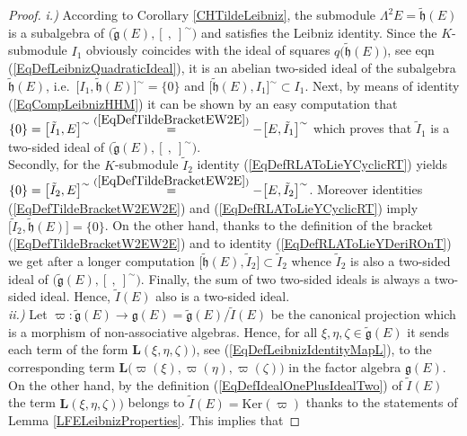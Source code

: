 \documentclass [11pt] {article}
\theoremstyle{definition}
\begin{document}
\begin{proof} \textit{i.)} According to  Corollary
	\ref{CHTildeLeibniz}, the submodule $\Lambda^2E=\tilde{\mathfrak{h}}(E)$
	is a subalgebra of
	 $\big(\tilde{\mathfrak{g}}(E),[~,~]^\sim\big)$ and satisfies the Leibniz identity. Since the $K$-submodule $I_1$ obviously coincides with the
	 ideal of squares $q\big(\tilde{\mathfrak{h}}(E)\big)$,
	 see eqn (\ref{EqDefLeibnizQuadraticIdeal}), it is an
	 abelian two-sided ideal of the subalgebra
	 $\tilde{\mathfrak{h}}(E)$, i.e.~$\big[I_1,\tilde{\mathfrak{h}}(E)\big]^\sim=\{0\}$
	      and $\big[\tilde{\mathfrak{h}}(E),I_1\big]^\sim\subset I_1$.
	 Next, by means of identity
	 (\ref{EqCompLeibnizHHM}) it can be shown by an easy computation that
	 $\{0\}=\big[\tilde{I}_1,E\big]^\sim
	    \stackrel{(\ref{EqDefTildeBracketEW2E})}{=}
	    -\big[E,\tilde{I}_1\big]^\sim$
	 which proves that $\tilde{I}_1$ is a two-sided ideal
	 of $\big(\tilde{\mathfrak{g}}(E),[~,~]^\sim\big)$.\\
	 Secondly, for the $K$-submodule $\tilde{I}_2$ identity (\ref{EqDefRLAToLieYCyclicRT}) yields
	$\{0\}=\big[\tilde{I}_2,E\big]^\sim
	\stackrel{(\ref{EqDefTildeBracketEW2E})}{=}
	-\big[E,\tilde{I}_2\big]^\sim$.
	Moreover identities (\ref{EqDefTildeBracketW2EW2E}) and (\ref{EqDefRLAToLieYCyclicRT}) imply
	$\big[\tilde{I}_2,\tilde{\mathfrak{h}}(E)\big]=
	    \{0\}$.
	On the other hand, thanks to the definition of the
	bracket (\ref{EqDefTildeBracketW2EW2E}) and to identity
	(\ref{EqDefRLAToLieYDeriROnT}) we get after a longer computation
	$\big[\tilde{\mathfrak{h}}(E),\tilde{I}_2\big]
	\subset \tilde{I}_2$
	whence $\tilde{I}_2$ is also a two-sided ideal of $\big(\tilde{\mathfrak{g}}(E),[~,~]^\sim\big)$.
	Finally, the sum of two two-sided ideals is always a
	two-sided ideal. Hence, $\tilde{I}(E)$ also is a two-sided ideal.\\
	\textit{ii.)} Let $\varpi: \tilde{\mathfrak{g}}(E)\to \mathfrak{g}(E)
	=\tilde{\mathfrak{g}}(E)/\tilde{I}(E)$ be the canonical projection which is
	a morphism of non-associative algebras. Hence, for all $\xi,\eta,\zeta\in
	\tilde{\mathfrak{g}}(E)$ it sends
	each term of the form $\mathbf{L}(\xi,\eta,\zeta)\big)$, see (\ref{EqDefLeibnizIdentityMapL}), to the corresponding term $\mathbf{L}\big(\varpi(\xi),\varpi(\eta),\varpi(\zeta)\big)$ in the factor algebra
	$\mathfrak{g}(E)$. On the other hand, by the definition (\ref{EqDefIdealOnePlusIdealTwo}) of $\tilde{I}(E)$ the term $\mathbf{L}(\xi,\eta,\zeta)\big)$ belongs to $\tilde{I}(E)=
	\mathrm{Ker}(\varpi)$
	thanks to the statements of Lemma \ref{LFELeibnizProperties}. This implies that

\end{proof}
\end{document}
